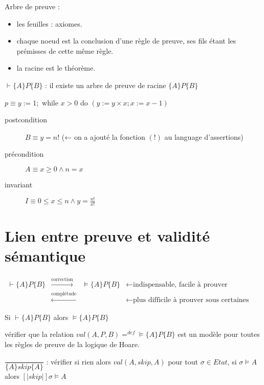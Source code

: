 \documentclass[10pt,a4paper]{article}
\newcommand{\semm}[1]{\left[| #1 | \right]}
\newcommand{\semh}[3]{\{#1\}#2\{#3\}}
\begin{document}
Arbre de preuve : \begin{itemize}
                   \item les feuilles : axiomes.
                   \item chaque noeud est la conclusion d'une règle de preuve, ses fils étant les prémisses de cette même règle.
                   \item la racine est le théorème.
                  \end{itemize}

$\vdash \semh{A}{P}{B}$ : il existe un arbre de preuve de racine $\semh{A}{P}{B}$

\begin{ex}
$ p \equiv y := 1;$ while $x > 0$ do $(y := y \times x; x := x-1)$

\begin{description}
 \item [postcondition] $B \equiv y = n!$  \quad  (← on a ajouté la fonction $(!)$ au language d'assertions)
 \item[précondition] $A \equiv x \geq 0 \wedge n = x$
 \item[invariant] $I \equiv 0 \leq x \leq n \wedge y = \frac{n!}{x!}$
\end{description}
\end{ex}


\section{Lien entre preuve et validité sémantique}

$\begin{array}{lcrr}
\vdash \semh{A}{P}{B} & \xrightarrow{\text{correction}}& \models \semh{A}{P}{B} &  ← \text{indispensable, facile à prouver}\\
                       & \xleftarrow{\text{complétude}} & & ← \text{plus difficile à prouver sous certaines hypothèses}
\end{array}$

\begin{thm}
 Si $\vdash \semh{A}{P}{B}$ alors $\models \semh{A}{P}{B}$
\end{thm}
\begin{dem}
 vérifier que la relation $val(A,P,B) =^{def} \models \semh{A}{P}{B}$ est un modèle pour toutes les règles de preuve de la logique de Hoare.
\end{dem}

$\dfrac{}{\semh{A}{skip}{A}}$ : vérifier \og si \og rien \fg alors $val(A, skip, A)$
			      pour tout $\sigma \in Etat$, si $\sigma \models A$ alors $\semm{skip} \sigma \models A$
\end{document}

